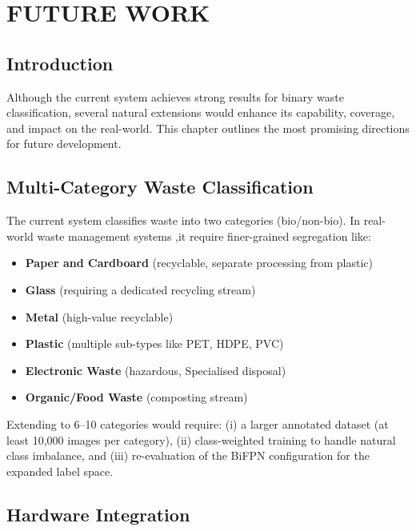 \chapter{FUTURE WORK}

\section{Introduction}

Although the current system achieves strong results for binary waste classification, several natural extensions would enhance its capability, coverage, and impact on the real-world. This chapter outlines the most promising directions for future development.

\section{Multi-Category Waste Classification}

The current system classifies waste into two categories (bio/non-bio). In real-world waste management systems ,it require finer-grained segregation like:
\begin{itemize}
    \item \textbf{Paper and Cardboard} (recyclable, separate processing from plastic)
    \item \textbf{Glass} (requiring a dedicated recycling stream)
    \item \textbf{Metal} (high-value recyclable)
    \item \textbf{Plastic} (multiple sub-types like PET, HDPE, PVC)
    \item \textbf{Electronic Waste} (hazardous, Specialised disposal)
    \item \textbf{Organic/Food Waste} (composting stream)
\end{itemize}

Extending to 6--10 categories would require: (i) a larger annotated dataset (at least 10,000 images per category), (ii) class-weighted training to handle natural class imbalance, and (iii) re-evaluation of the BiFPN configuration for the expanded label space.

\section{Hardware Integration}

